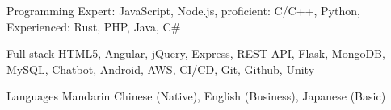
\begin{cvskills}
    \cvskill
    {Programming} %
    {Expert: JavaScript, Node.js, proficient: C/C++, Python, Experienced: Rust, PHP, Java, C\#} %

      \cvskill
        {Full-stack} %
        {HTML5, Angular, jQuery, Express, REST API, Flask, MongoDB, MySQL, Chatbot, Android, AWS, CI/CD, Git, Github, Unity} %

      \cvskill
        {Languages} %
        {Mandarin Chinese (Native), English (Business), Japanese (Basic)} %
    
\end{cvskills}
